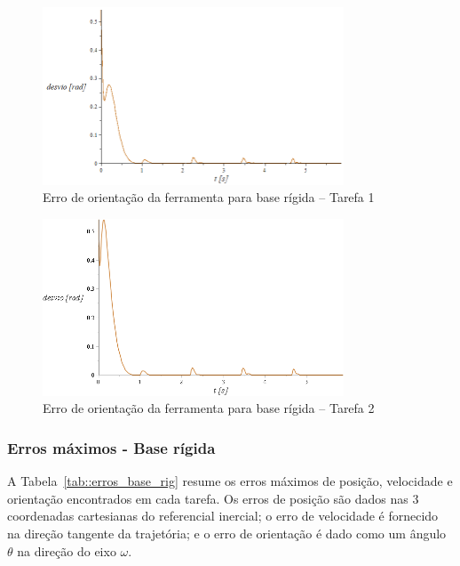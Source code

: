 \begin{figure}[h!]
	\centering 
 	\includegraphics[width=0.80\textwidth]{figs/t1_erroori_base_rig}
 	\caption{Erro de orientação da ferramenta para base rígida -- Tarefa
 	1}
 	\label{fig::t1_erroori_base_rig}
\end{figure}

\begin{figure}[h!]
	\centering 
 	\includegraphics[width=0.80\textwidth]{figs/t2_erroori_base_rig}
 	\caption{Erro de orientação da ferramenta para base rígida -- Tarefa
 	2}
 	\label{fig::t2_erroori_base_rig}
\end{figure}

\subsubsection{Erros máximos - Base rígida}

A Tabela~\ref{tab::erros_base_rig} resume os erros máximos de posição,
velocidade e orientação encontrados em cada tarefa. Os erros de posição
são dados nas 3 coordenadas cartesianas do referencial inercial; o erro
de velocidade é fornecido na direção tangente da trajetória; e o erro de
orientação é dado como um ângulo $\theta$ na direção do eixo $\omega$.

